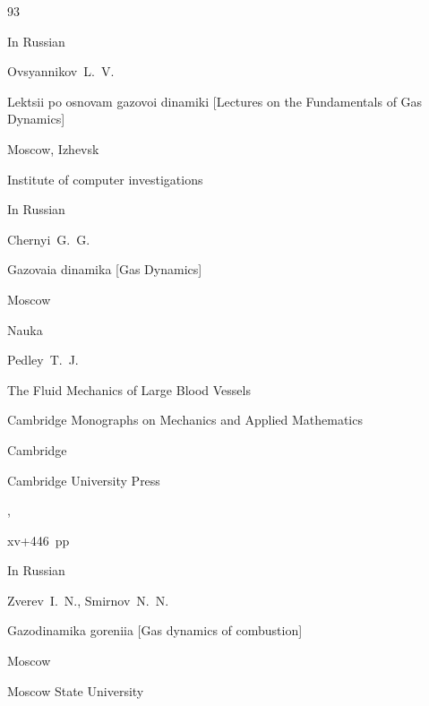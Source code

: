 \begin{thebibliography}{93}

\lang In Russian

\by Ovsyannikov~L.~V.

\book Lektsii po osnovam gazovoi dinamiki \rm [Lectures on the Fundamentals of Gas Dynamics]

\publaddr Moscow, Izhevsk

\publ Institute of computer investigations










\lang In Russian

\by Chernyi~G.~G.

\book Gazovaia dinamika \rm [Gas Dynamics]

\publaddr Moscow

\publ Nauka








\by Pedley~T.~J.

\book The Fluid Mechanics of Large Blood Vessels

\serial Cambridge Monographs on Mechanics and Applied Mathematics

\publaddr Cambridge

\publ Cambridge University Press 

,


xv+446~pp





\lang In Russian

\by Zverev~I.~N., Smirnov~N.~N.

\book Gazodinamika goreniia \rm [Gas dynamics of combustion]

\publaddr Moscow

\publ Moscow State University









\end{thebibliography}



\EngDate





